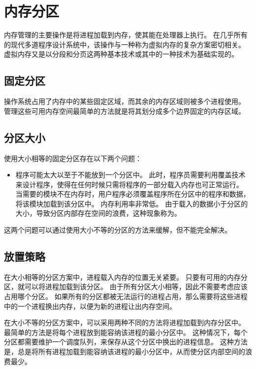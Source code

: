 
\section{内存分区}
{
    内存管理的主要操作是将进程加载到内存，使其能在处理器上执行。
    在几乎所有的现代多道程序设计系统中，该操作与一种称为虚拟内存的复杂方案密切相关。
    虚拟内存又是以分段和分页这两种基本技术或其中的一种技术为基础实现的。

    \subsection{固定分区}
    {
        操作系统占用了内存中的某些固定区域，而其余的内存区域则被多个进程使用。
        管理这些可用内存空间最简单的方法就是将其划分成多个边界固定的内存区域。
    }

    \subsection{分区大小}
    {
        使用大小相等的固定分区存在以下两个问题：

        \begin{itemize}
            \item
            {
                程序可能太大以至于不能放到一个分区中。
                此时，程序员需要利用覆盖技术来设计程序，使得在任何时候只需将程序的一部分载入内存也可正常运行。
                当需要的模块不在内存时，用户程序必须覆盖程序所在分区中的程序和数据，将该模块加载到该分区中。
            }
            {
                内存利用率非常低。
                由于载入的数据小于分区的大小，导致分区内部存在空间的浪费，这种现象称为。
            }
        \end{itemize}

        这两个问题可以通过使用大小不等的分区的方法来缓解，但不能完全解决。
    }

    \subsection{放置策略}
    {
        在大小相等的分区方案中，进程载入内存的位置无关紧要。
        只要有可用的内存分区，就可以将进程加载到该分区。
        由于所有分区大小相等，因此不需要考虑应该占用哪个分区。
        如果所有的分区都被无法运行的进程占用，那么需要将这些进程中的一个进程换出内存，以便为新的进程让出内存空间。

        在大小不等的分区方案中，可以采用两种不同的方法将进程加载到内存分区中。
        最简单的方法是将每个进程放到能容纳该进程的最小分区中。
        这种情况下，每个分区都需要维护一个调度队列，来保存从这个分区中换出的进程信息。
        这种方法是，总是将所有进程加载到能容纳该进程的最小分区中，从而使分区内部空间的浪费最少。

}}
